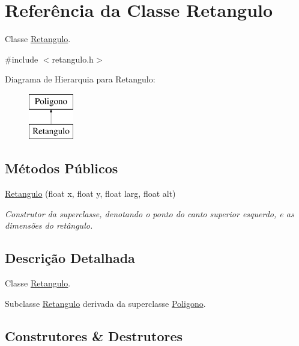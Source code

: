 \hypertarget{classRetangulo}{}\section{Referência da Classe Retangulo}
\label{classRetangulo}


Classe \hyperlink{classRetangulo}{Retangulo}.  




{\ttfamily \#include $<$retangulo.\+h$>$}

Diagrama de Hierarquia para Retangulo\+:\begin{figure}[H]
\begin{center}
\leavevmode
\includegraphics[height=2.000000cm]{classRetangulo}
\end{center}
\end{figure}
\subsection*{Métodos Públicos}
\begin{DoxyCompactItemize}
\item 
\hyperlink{classRetangulo_a92ef3678e78c886880e62e181684104a}{Retangulo} (float x, float y, float larg, float alt)
\begin{DoxyCompactList}\small\item\em Construtor da superclasse, denotando o ponto do canto superior esquerdo, e as dimensões do retângulo. \end{DoxyCompactList}\end{DoxyCompactItemize}


\subsection{Descrição Detalhada}
Classe \hyperlink{classRetangulo}{Retangulo}. 

Subclasse \hyperlink{classRetangulo}{Retangulo} derivada da superclasse \hyperlink{classPoligono}{Poligono}. 

\subsection{Construtores \& Destrutores}
\mbox{\label{classRetangulo_a92ef3678e78c886880e62e181684104a}} 
